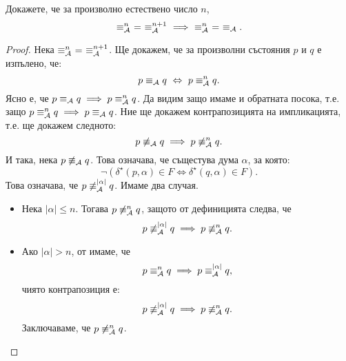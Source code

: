 \begin{proposition}\label{pr:minimisation-cubic:equiv-approx}
  Докажете, че за произволно естествено число $n$,
  \[\equiv^n_\A\ =\ \equiv^{n+1}_\A\ \implies\ \equiv^n_\A\ =\ \equiv_\A.\]
\end{proposition}
\begin{proof}
  Нека $\equiv^n_\A\ =\ \equiv^{n+1}_\A$.
  Ще докажем, че за произволни състояния $p$ и $q$ е изпълено, че:
  \[p \equiv_{\mathcal{A}} q \ \Leftrightarrow\  p \equiv^n_{\mathcal{A}} q.\]
  Ясно е, че $p \equiv_{\mathcal{A}} q \implies p \equiv^n_{\mathcal{A}} q$. 
  Да видим защо имаме и обратната посока, т.е. защо $p \equiv^n_{\mathcal{A}} q \implies p \equiv_{\mathcal{A}} q$.
  Ние ще докажем контрапозицията на импликацията, т.е. ще докажем следното:
  \[p \not\equiv_{\mathcal{A}} q \implies p \not\equiv^n_{\mathcal{A}} q.\]
  И така, нека $p \not\equiv_{\mathcal{A}} q$. Това означава, че същестува дума $\alpha$, за която:
  \[\neg(\delta^\star(p,\alpha) \in F \iff \delta^\star(q,\alpha) \in F).\]
  Това означава, че $p \not\equiv^{|\alpha|}_{\mathcal{A}} q$. Имаме два случая.
  \begin{itemize}
  \item
    Нека $|\alpha| \leq n$.
    Тогава $p \not\equiv^n_{\mathcal{A}} q$, защото от дефиницията следва, че
    \[p \not\equiv^{|\alpha|}_{\mathcal{A}} q \implies p \not\equiv^n_{\mathcal{A}} q.\]
  \item
    Ако $|\alpha| > n$, от  имаме, че
    \[p \equiv^n_{\mathcal{A}} q \implies p \equiv^{|\alpha|}_{\mathcal{A}} q,\]
    чиято контрапозиция е:
    \[p \not\equiv^{|\alpha|}_{\mathcal{A}} q \implies p \not\equiv^{n}_{\mathcal{A}} q.\]
    Заключаваме, че $p \not\equiv^{n}_{\mathcal{A}} q$.
  \end{itemize}
\end{proof}

